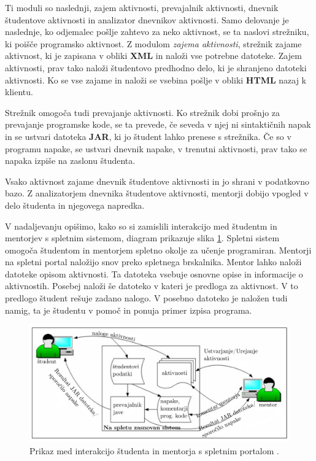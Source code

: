 Ti moduli so naslednji, zajem aktivnosti, prevajalnik aktivnosti,
dnevnik študentove aktivnosti in analizator dnevnikov aktivnosti. Samo
delovanje je naslednje, ko odjemalec pošlje zahtevo za neko aktivnost,
se ta naslovi strežniku, ki poišče programsko aktivnost. Z modulom
\emph{zajema aktivnosti}, strežnik zajame aktivnost, ki je zapisana v
obliki \textbf{XML} in naloži vse potrebne datoteke. Zajem aktivnosti,
prav tako naloži študentovo predhodno delo, ki je shranjeno datoteki
aktivnosti. Ko se vse zajame in naloži se vsebina pošlje v obliki
\textbf{HTML} nazaj k klientu.

Strežnik omogoča tudi prevajanje aktivnosti. Ko strežnik dobi prošnjo
za prevajanje programske kode, se ta prevede, če seveda v njej ni
sintaktičnih napak in se ustvari datoteka \textbf{JAR}, ki jo študent
lahko prenese s strežnika. Če so v programu napake, se ustvari dnevnik
napake, v trenutni aktivnosti, prav tako se napaka izpiše na zaslonu
študenta.

Vsako aktivnost zajame dnevnik študentove aktivnosti in jo shrani v
podatkovno bazo. Z analizatorjem dnevnika študentove aktivnosti,
mentorji dobijo vpogled v delo študenta in njegovega napredka.


V nadaljevanju opišimo, kako so si zamislili interakcijo med študentm
in mentorjev s spletnim sistemom, diagram prikazuje slika
\ref{fig:OUHK_workFlow}. Spletni sistem omogoča študentom in mentorjem
spletno okolje za učenje programiran. Mentorji na spletni portal
naložijo snov preko spletnega brskalnika. Mentor lahko naloži datoteke
opisom aktivnosti. Ta datoteka vsebuje osnovne opise in informacije o
aktivnostih. Posebej naloži še datoteko v kateri je predloga za
aktivnost. V to predlogo študent rešuje zadano nalogo. V posebno
datoteko je naložen tudi namig, ta je študentu v pomoč in ponuja
primer izpisa programa.

\begin{figure}[htb!] \centering
  \includegraphics[width=0.9\linewidth, keepaspectratio =
1]{./images/SystemArch02_OUHK_DistanceEdu.jpg}
\caption{Prikaz med interakcijo študenta in mentorja s spletnim
  portalom \cite{ITaLCP_DistanceEdu}.}
  \label{fig:OUHK_workFlow}
\end{figure}

